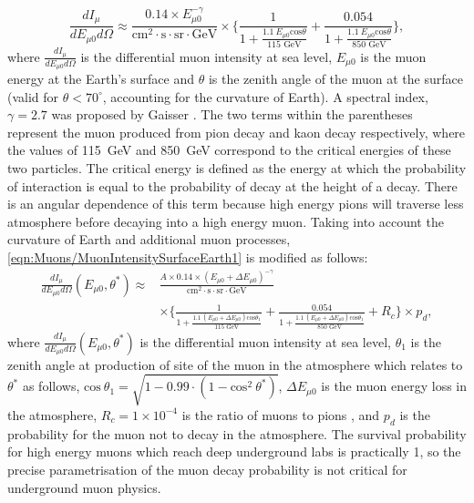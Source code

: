 \begin{equation}
    \label{eqn:Muons/MuonIntensitySurfaceEarth1}
    \frac{dI_\mu}{dE_{\mu0}d\Omega}\approx\frac{0.14\times E^{-\gamma}_{\mu0}}{\text{cm}^2\cdot\text{s}\cdot\text{sr}\cdot\text{GeV}}\times\Biggl\{\frac{1}{1+\frac{1.1\:E_{\mu0}\text{cos}\theta}{115\text{ GeV}}}+\frac{0.054}{1+\frac{1.1\:E_{\mu0}\text{cos}\theta}{850\text{ GeV}}}\Biggl\},
\end{equation}
where $\frac{dI_\mu}{dE_{\mu0}d\Omega}$ is the differential muon intensity at sea level, $E_{\mu0}$ is the muon energy at the Earth's surface and $\theta$ is the zenith angle of the muon at the surface (valid for $\theta<70^\circ$, accounting for the curvature of Earth). A spectral index, $\gamma=2.7$ was proposed by Gaisser \cite{Gaisser_Engel_Resconi_2016}. The two terms within the parentheses represent the muon produced from pion decay and kaon decay respectively, where the values of 115~GeV and 850~GeV correspond to the critical energies of these two particles. The critical energy is defined as the energy at which the probability of interaction is equal to the probability of decay at the height of a decay. There is an angular dependence of this term because high energy pions will traverse less atmosphere before decaying into a high energy muon.
Taking into account the curvature of Earth and additional muon processes, \autoref{eqn:Muons/MuonIntensitySurfaceEarth1} is modified as follows:
\begin{equation}
\label{eqn:Muons/MuonIntensitySurfaceEarth2}
\begin{split}    
    \frac{dI_\mu}{dE_{\mu0}d\Omega}(E_{\mu0},\theta^*)\approx&\frac{A\times 0.14\times (E_{\mu0}+\Delta E_{\mu0})^{-\gamma}}{\text{cm}^2\cdot\text{s}\cdot\text{sr}\cdot\text{GeV}}\\
    &\times\Biggl\{\frac{1}{1+\frac{1.1\:(E_{\mu0}+\Delta E_{\mu0})\text{cos}\theta_1}{115\text{ GeV}}}+\frac{0.054}{1+\frac{1.1\:(E_{\mu0}+\Delta E_{\mu0})\text{cos}\theta_1}{850\text{ GeV}}}+R_c\Biggl\}\times p_d,
\end{split}
\end{equation}
where $\frac{dI_\mu}{dE_{\mu0}d\Omega}(E_{\mu0},\theta^*)$ is the differential muon intensity at sea level, $\theta_1$ is the zenith angle at production of site of the muon in the atmosphere which relates to $\theta^*$ as follows, $\text{cos}\:\theta_1=\sqrt{1-0.99\cdot(1-\text{cos}^2\:\theta^*)}$, $\Delta E_{\mu0}$ is the muon energy loss in the atmosphere, $R_c=1\times10^{-4}$ is the ratio of muons to pions \cite{LVD:1998lir}, and $p_d$ is the probability for the muon not to decay in the atmosphere. The survival probability for high energy muons which reach deep underground labs is practically 1, so the precise parametrisation of the muon decay probability is not critical for underground muon physics.

